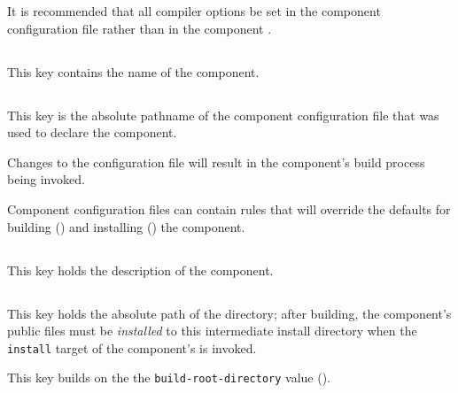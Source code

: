 It is recommended that all compiler options be set in the component
configuration file rather than in the component \makefile.


\subsection{}\label{variables:component}

This key contains the name of the component.


\subsection{}\label{variables:configuration-file}

This key is the absolute pathname of the component configuration file
that was used to declare the component.

Changes to the configuration file will result in the component's build
process being invoked.

Component configuration files can contain \makefile rules that will
override the defaults for building
() and installing
() the component.


\subsection{}\label{variables:description}

This key holds the description of the component.


\subsection{}\label{variables:destdir-directory}

This key holds the absolute path of the \destdir directory; after
building, the component's public files must be \emph{installed} to this
intermediate install directory when the \texttt{install} target of the
component's \makefile is invoked.

This key builds on the the \texttt{build-root-directory} value
().

